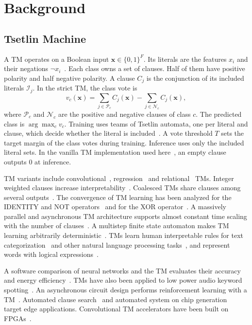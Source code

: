 \documentclass[preprint,review,12pt]{elsarticle}
\begin{document}
\section{Background}\label{sec:background}

\subsection{Tsetlin Machine}
A TM operates on a Boolean input $\mathbf{x}\in\{0,1\}^F$.
Its literals are the features $x_i$ and their negations $\lnot x_i$~\cite{granmo2018tsetlin}.
Each class owns a set of clauses. Half of them have positive polarity and half negative polarity.
A clause $C_j$ is the conjunction of its included literals $\mathcal{I}_j$.
In the strict TM, the class vote is
\begin{equation}
v_c(\mathbf{x}) = \sum_{j\in\mathcal{P}_c} C_j(\mathbf{x}) - \sum_{j\in\mathcal{N}_c} C_j(\mathbf{x}),
\end{equation}
where $\mathcal{P}_c$ and $\mathcal{N}_c$ are the positive and negative clauses of class $c$.
The predicted class is $\arg\max_c v_c$.
Training uses teams of Tsetlin automata, one per literal and clause, which decide whether the literal is included~\cite{granmo2018tsetlin}. A vote threshold $T$ sets the target margin of the class votes during training.
Inference uses only the included literal sets.
In the vanilla TM implementation used here~\cite{pytsetlin}, an empty clause outputs 0 at inference.

TM variants include convolutional~\cite{granmo2019convolutional}, regression~\cite{abeyrathna2020regression} and relational~\cite{saha2022relational} TMs.
Integer weighted clauses increase interpretability~\cite{abeyrathna2021integer}. Coalesced TMs share clauses among several outputs~\cite{glimsdal2021coalesced}.
The convergence of TM learning has been analyzed for the IDENTITY and NOT operators~\cite{zhang2022identity} and for the XOR operator~\cite{jiao2023xor}.
A massively parallel and asynchronous TM architecture supports almost constant time scaling with the number of clauses~\cite{abeyrathna2020massively}. A multistep finite state automaton makes TM learning arbitrarily deterministic~\cite{abeyrathna2020multistep}.
TMs learn human interpretable rules for text categorization~\cite{berge2019text} and other natural language processing tasks~\cite{saha2023nlp}, and represent words with logical expressions~\cite{bhattarai2024embedding}.

A software comparison of neural networks and the TM evaluates their accuracy and energy efficiency~\cite{lei2020arithmetic}. TMs have also been applied to low power audio keyword spotting~\cite{lei2021kws}.
An asynchronous circuit design performs reinforcement learning with a TM~\cite{wheeldon2021selftimed}.
Automated clause search~\cite{rahman2022mileage} and automated system on chip generation~\cite{rahman2024matador} target edge applications.
Convolutional TM accelerators have been built on FPGAs~\cite{tunheim2022ctm,tunheim2023ctm}.
\end{document}
